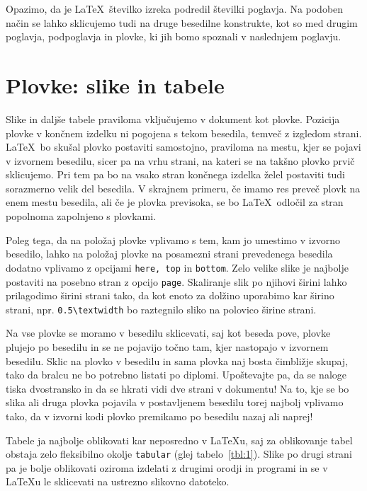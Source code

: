 \documentclass[a4paper, 12pt]{book}
\begin{document}
Opazimo, da je \LaTeX\ številko izreka podredil številki poglavja.
Na podoben način se lahko sklicujemo tudi na druge besedilne konstrukte, kot so med drugim poglavja, podpoglavja in plovke, ki jih bomo spoznali v naslednjem poglavju.


\chapter{Plovke: slike in tabele}
\label{ch2}

Slike in daljše tabele praviloma vključujemo v dokument kot plovke. 
Pozicija plovke v končnem izdelku ni pogojena s tekom besedila, temveč z izgledom strani. 
\LaTeX\ bo skušal plovko postaviti samostojno, praviloma na mestu, kjer se pojavi v izvornem besedilu, sicer pa na 
vrhu strani, na kateri se na takšno plovko prvič sklicujemo. 
Pri tem pa bo na vsako stran končnega izdelka želel postaviti tudi sorazmerno velik del besedila. 
V skrajnem primeru, če imamo res preveč plovk na enem mestu besedila, ali če je plovka previsoka, se bo \LaTeX\ odločil za stran popolnoma zapolnjeno s plovkami.

Poleg tega, da na položaj plovke vplivamo s tem, kam jo umestimo v izvorno besedilo, lahko na položaj plovke na posamezni strani prevedenega besedila dodatno vplivamo z opcijami \texttt{here, top} in \texttt{bottom}.
Zelo velike slike je najbolje postaviti na posebno stran z opcijo \texttt{page}.
Skaliranje slik po njihovi širini lahko prilagodimo širini strani tako, da kot enoto za dolžino uporabimo kar širino strani, npr. \verb=0.5\textwidth= bo raztegnilo sliko na polovico širine strani.

Na vse plovke se moramo v besedilu sklicevati, saj kot beseda pove, plovke plujejo po besedilu in se ne pojavijo točno tam, kjer nastopajo v izvornem besedilu.
Sklic na plovko v besedilu in sama plovka naj bosta čimbližje skupaj, tako da bralcu ne bo potrebno listati po diplomi. 
Upoštevajte pa, da se naloge tiska dvostransko in da se hkrati vidi dve strani v dokumentu!
Na to, kje se bo slika ali druga plovka pojavila v postavljenem besedilu torej najbolj vplivamo tako, da v izvorni kodi plovko premikamo po besedilu nazaj ali naprej!

Tabele ja najbolje oblikovati kar neposredno v \LaTeX u, saj za oblikovanje tabel obstaja zelo fleksibilno okolje \texttt{tabular} (glej tabelo~\ref{tbl:1}).
Slike po drugi strani pa je bolje oblikovati oziroma izdelati z drugimi orodji in programi in se v \LaTeX u le sklicevati na ustrezno slikovno datoteko.
\end{document}
